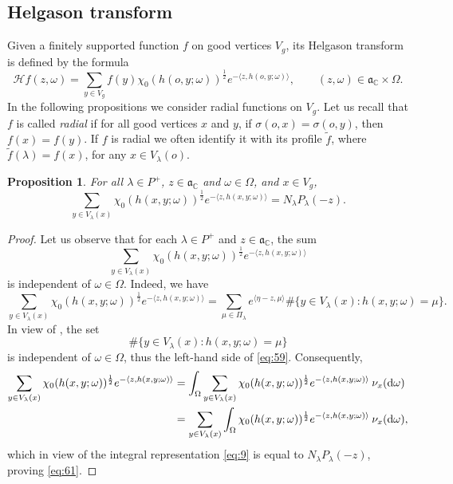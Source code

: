 \documentclass[11pt]{amsart}
\newcommand{\CC}{\mathbb{C}}
\newcommand{\calH}{\mathcal{H}}
\newcommand{\sprod}[2]{\langle {#1}, {#2} \rangle}
\theoremstyle{plain}
\newtheorem{proposition}[theorem]{Proposition}
\theoremstyle{definition}
\numberwithin{equation}{section}
\begin{document}
\subsection{Helgason transform}
Given a finitely supported function $f$ on good vertices $V_g$, its Helgason transform is defined by the formula
\[
	\calH f(z, \omega) = \sum_{y \in V_g} f(y) \chi_0(h(o, y; \omega))^{\frac{1}{2}} e^{-\sprod{z}{h(o, y; \omega)}},
	\qquad (z, \omega) \in \mathfrak{a}_\CC \times \Omega.
\]
In the following propositions we consider radial functions on $V_g$. Let us recall that $f$ is called \emph{radial} if
for all good vertices $x$ and $y$, if $\sigma(o, x)=\sigma(o, y)$, then $f(x)=f(y)$. If $f$ is radial we often identify it
with its profile $\tilde{f}$, where $\tilde{f}(\lambda) = f(x)$, for any $x \in V_\lambda(o)$.
\begin{proposition}
	\label{prop:4}
	For all $\lambda \in P^+$, $z \in \mathfrak{a}_\CC$ and $\omega \in \Omega$, and $x \in V_g$,
	\begin{equation}
		\label{eq:61}
		\sum_{y \in V_\lambda(x)} \chi_0(h(x, y; \omega))^{\frac12} e^{-\sprod{z}{h(x, y; \omega)}}
		=
		N_\lambda P_\lambda(-z).
	\end{equation}
\end{proposition}
\begin{proof}
	Let us observe that for each $\lambda \in P^+$ and $z \in \mathfrak{a}_\CC$, the sum
	\[
		\sum_{y \in V_\lambda(x)} \chi_0(h(x, y; \omega))^{\frac12} e^{-\sprod{z}{h(x, y; \omega)}}
	\]
	is independent of $\omega \in \Omega$. Indeed, we have
	\begin{equation}
		\label{eq:59}
		\sum_{y \in V_\lambda(x)} \chi_0(h(x, y; \omega))^{\frac12} e^{-\sprod{z}{h(x, y; \omega)}}
		=
		\sum_{\mu \in \Pi_\lambda} e^{\sprod{\eta-z}{\mu}} \#\{y \in V_\lambda(x) : h(x, y; \omega) = \mu\}.
	\end{equation}
	In view of \cite[Lemma 3.19]{park2}, the set
	\[
		\#\{y\in V_{\lambda}(x): h(x,y;\omega)=\mu\}
	\]
	is independent of $\omega \in \Omega$, thus the left-hand side of \eqref{eq:59}. Consequently,
	\begin{align*}
		\sum_{y \in V_\lambda(x)} \chi_0(h(x, y; \omega))^{\frac12} e^{-\sprod{z}{h(x, y; \omega)}}
		&=
		\int_\Omega
		\sum_{y \in V_\lambda(x)} \chi_0(h(x, y; \omega))^{\frac12} e^{-\sprod{z}{h(x, y; \omega)}}
		\: \nu_x({\rm d} \omega) \\
		&=
		\sum_{y \in V_\lambda(x)}
		\int_\Omega
		\chi_0 (h(x, y; \omega))^{\frac12} e^{-\sprod{z}{h(x, y; \omega)}}
		\: \nu_x({\rm d} \omega),
	\end{align*}
	which in view of the integral representation \eqref{eq:9} is equal to $N_\lambda P_\lambda(-z)$,
	proving \eqref{eq:61}.
\end{proof}
\end{document}
